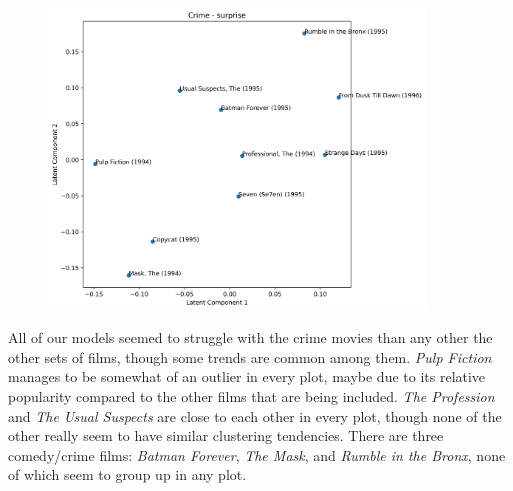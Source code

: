 \begin{figure}[H]
    \centering
\end{figure}
\begin{figure}[H]
    \centering 
    \includegraphics[width=10cm]{crime_SVD_sp.png}
\end{figure}

All of our models seemed to struggle with the crime movies than any other the other sets of films, though some trends are common among them. 
\textit{Pulp Fiction} manages to be somewhat of an outlier in every plot, maybe due to its relative popularity compared to the other films 
that are being included. \textit{The Profession} and \textit{The Usual Suspects} are close to each other in every plot, though none of the other 
really seem to have similar clustering tendencies. There are three comedy/crime films: \textit{Batman Forever}, \textit{The Mask}, and \textit{
Rumble in the Bronx}, none of which seem to group up in any plot.


